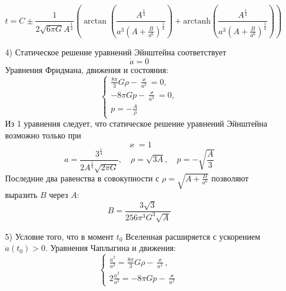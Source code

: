 \documentclass[12pt]{article}
\theoremstyle{definition}
\begin{document}
\begin{enumerate}
\begin{itemize}
\begin{equation}
        \end{equation}
        \begin{equation}
            \boxed{t=C\pm\frac{1}{2\sqrt{6\pi G}A^\frac{1}{4}}\left(\arctan\left(\frac{A^\frac{1}{4}}{a^3(A+\frac{B}{a^6})^\frac{1}{4}}\right)+\text{arctanh}\left(\frac{A^\frac{1}{4}}{a^3(A+\frac{B}{a^6})^\frac{1}{4}}\right)\right)}
        \end{equation}
        \item[4)] Статическое решение уравнений Эйнштейна соответствует
        \begin{equation}
            \dot{a}=0
        \end{equation}
        Уравнения Фридмана, движения и состояния:
        \begin{equation}
        \begin{cases}
            \frac{8\pi}{3}G\rho-\frac{\varkappa}{a^2}=0,\\
            -8\pi Gp-\frac{\varkappa}{a^2}=0,\\
            p=-\frac{A}{\rho}
        \end{cases}
        \end{equation}
        Из 1 уравнения следует, что статическое решение уравнений Эйнштейна возможно только при
        \begin{equation}
            \boxed{\varkappa=1}
        \end{equation}
        \begin{equation}
            \boxed{a=\frac{3^\frac{1}{4}}{2A^\frac{1}{4}\sqrt{2\pi G}},\quad\rho=\sqrt{3A},\quad p=-\sqrt{\frac{A}{3}}}
        \end{equation}
        Последние два равенства в совокупности с $\rho=\sqrt{A+\frac{B}{a^6}}$ позволяют выразить $B$ через $A$:
        \begin{equation}
            \boxed{B=\frac{3\sqrt{3}}{256\pi^3G^3\sqrt{A}}}
        \end{equation}
        \item[5)] Условие того, что в момент $t_0$ Вселенная расширяется с ускорением $\ddot{a}(t_0)>0$. Уравнения Чаплыгина и движения:
        \begin{equation}
            \begin{cases}
                \frac{\dot{a}^2}{a^2}=\frac{8\pi}{3}G\rho-\frac{\varkappa}{a^2},\\
                2\frac{\dot{a}^2}{a^2}=-8\pi Gp-\frac{\varkappa}{a^2}
            \end{cases}
        \end{equation}

\end{itemize}
\end{enumerate}
\end{document}
